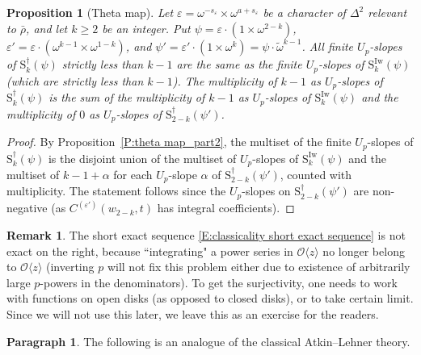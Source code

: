 \documentclass[12pt]{amsart}
\newtheorem{proposition}[subsection]{Proposition}
\theoremstyle{definition}
\newtheorem{remark}[subsection]{Remark}
\newtheorem{para}[subsection]{Paragraph}
\numberwithin{equation}{subsection}
\def\calO{\mathcal{O}}
\def\rmS{\mathrm{S}}
\newcommand{\Iw}{\mathrm{Iw}}
\begin{document}
\begin{proposition}[Theta map]
\label{P:theta map_part3}
Let $\varepsilon = \omega^{-s_\varepsilon} \times \omega^{a+s_\varepsilon}$ be a character of $\Delta^2$ relevant to $\bar \rho$, and let $k \geq 2$ be an integer. Put $\psi = \varepsilon \cdot (1\times \omega^{2-k})$, $\varepsilon' = \varepsilon \cdot (\omega^{k-1} \times \omega^{1-k})$, and $\psi' = \varepsilon'\cdot (1 \times \omega^k) = \psi\cdot \tilde \omega^{k-1}$. All finite $U_p$-slopes of $\rmS^{\dagger}_{k}(\psi)$ strictly less than $k-1$ are the same as the finite $U_p$-slopes of $\rmS_{k}^\Iw( \psi)$ (which are strictly less than $k-1$). The multiplicity of $k-1$ as $U_p$-slopes of $\rmS^{\dagger}_{k}(\psi)$ is the sum of the multiplicity of $k-1$ as $U_p$-slopes of $\rmS_{k}^\Iw(\psi)$ and the multiplicity of $0$ as $U_p$-slopes of $\rmS^{\dagger}_{2-k}(\psi')$.
\end{proposition}
\begin{proof}
By Proposition~\ref{P:theta map_part2}, the multiset of the finite $U_p$-slopes of $\rmS_{k}^{\dagger}(\psi)$ is the disjoint union of the multiset of $U_p$-slopes of $\rmS_{k}^{\Iw}(\psi)$ and the multiset of $k-1+\alpha$ for each $U_p$-slope $\alpha$ of $\rmS_{2-k}^{\dagger}(\psi')$, counted with multiplicity. The statement follows since the $U_p$-slopes on $\rmS_{2-k}^{\dagger}(\psi')$ are non-negative (as $C^{(\varepsilon')}(w_{2-k}, t)$ has integral coefficients).
\end{proof}


\begin{remark} The short exact sequence \eqref{E:classicality short exact sequence} is not exact on the right, because ``integrating" a power series in $\calO\langle z\rangle $ no longer belong to $\calO\langle z\rangle$ (inverting $p$ will not fix this problem either due to existence of arbitrarily large $p$-powers in the denominators). To get the surjectivity, one needs to work with functions on open disks (as opposed to closed disks), or to take certain limit. Since we will not use this later, we leave this as an exercise for the readers.

\end{remark}


\begin{para}
\label{P:para_119}
The following is an analogue of the classical Atkin--Lehner theory. 
\end{para}
\end{document}
